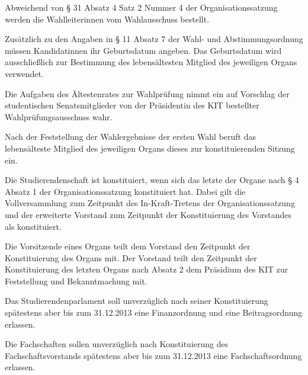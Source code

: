 \begin{jurdoc}
Abweichend von § 31 Absatz 4 Satz 2 Nummer 4 der Organisationssatzung werden die Wahlleiterinnen vom Wahlausschuss bestellt.

Zusätzlich zu den Angaben in  § 11 Absatz 7 der Wahl- und Abstimmungsordnung müssen Kandidatinnen ihr Geburtsdatum angeben. Das Geburtsdatum wird ausschließlich zur Bestimmung des lebensältesten Mitglied des jeweiligen Organs verwendet.

Die Aufgaben des Ältestenrates  zur Wahlprüfung nimmt ein auf Vorschlag der studentischen Senatsmitglieder von der Präsidentin des KIT bestellter Wahlprüfungsausschuss wahr.


\label{konstituierung}

Nach der Feststellung der Wahlergebnisse der ersten Wahl beruft das lebensälteste Mitglied des jeweiligen Organs dieses zur konstituierenden Sitzung ein.

Die Studierendenschaft ist konstituiert, wenn sich das letzte der Organe nach § 4 Absatz 1 der Organisationssatzung konstituiert hat. Dabei gilt die Vollversammlung zum Zeitpunkt des In-Kraft-Tretens der Organisationssatzung und der erweiterte Vorstand zum Zeitpunkt der Konstituierung des Vorstandes als konstituiert.

Die Vorsitzende eines Organs teilt dem Vorstand den Zeitpunkt der Konstituierung des Organs mit. Der Vorstand teilt den Zeitpunkt der Konstituierung des letzten Organs nach Absatz 2 dem Präsidium des KIT zur Feststellung und Bekanntmachung mit.


Das Studierendenparlament soll unverzüglich nach seiner Konstituierung spätestens aber bis zum 31.12.2013 eine Finanzordnung und eine Beitragsordnung erlassen.

Die Fachschaften sollen unverzüglich nach Konstituierung des Fachschaftsvorstands spätestens aber bis zum 31.12.2013 eine Fachschaftsordnung erlassen.

\end{jurdoc}
